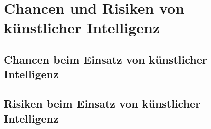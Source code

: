 \newpage
\section{Chancen und Risiken von künstlicher Intelligenz} \label{Chancen und Risken von KI}

\subsection{Chancen beim Einsatz von künstlicher Intelligenz}
\subsection{Risiken beim Einsatz von künstlicher Intelligenz}
